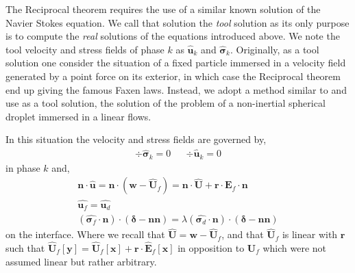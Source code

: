 The Reciprocal theorem requires the use of a similar known solution of the Navier Stokes equation.
We call that solution the \textit{tool} solution as its only purpose is to compute the \textit{real} solutions of the equations introduced above. 
We note the tool velocity and stress fields of phase $k$ as $\hat{\textbf{u}}_k$ and $\hat{\bm\sigma}_k$. 
Originally, as a tool solution one consider the situation of a fixed particle immersed in a velocity field generated by a point force on its exterior, in which case the Reciprocal theorem end up giving the famous Faxen laws.
Instead, we adopt a method similar to \citet{stone2001inertial} and use as a tool solution, the solution of the problem of a non-inertial spherical droplet immersed in a linear flows. 

In this situation the velocity and stress fields are governed by, 
\begin{align*}
    \div \hat{\bm\sigma}_k = 0 
    && \div \hat{\textbf{u}}_k = 0 
    \label{eq:tool_sol}
\end{align*}
in phase $k$ and, 
\begin{align}    
    \textbf{n}\cdot \hat{\textbf{u}}=  \textbf{n}\cdot(\textbf{w} - \hat{\textbf{U}}_f) = \textbf{n}\cdot \hat{\textbf{U}} + \textbf{r}\cdot \textbf{E}_f \cdot \textbf{n}\\
    \hat{\textbf{u}_f} = \hat{\textbf{u}_d}\\
    (\hat{\bm\sigma_f}\cdot \textbf{n}) \cdot (\bm\delta - \textbf{nn})
    = 
    \lambda (\hat{\bm\sigma_d}\cdot \textbf{n}) \cdot (\bm\delta - \textbf{nn}) \label{eq:bc_stress}
\end{align} 
on the interface. 
Where we recall that $\hat{\textbf{U}} = \textbf{w} - \hat{\textbf{U}}_f$, and that $\hat{\textbf{U}}_f$ is linear with $\textbf{r}$ such that $ \hat{\textbf{U}}_f[\textbf{y}] = \hat{\textbf{U}}_f[\textbf{x}]+\textbf{r}\cdot \hat{\textbf{E}}_f[\textbf{x}]$ in opposition to $\textbf{U}_f$ which were not assumed linear but rather arbitrary. 


